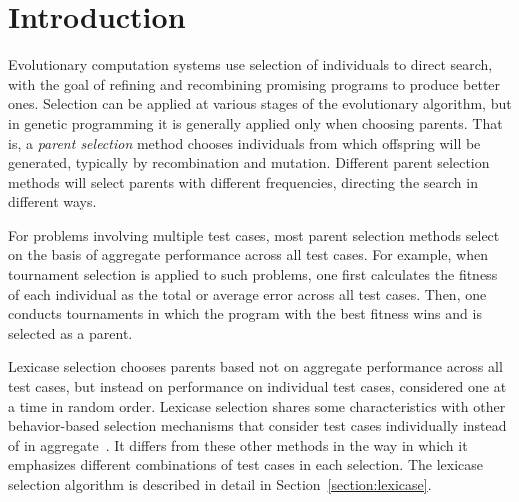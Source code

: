\documentclass{sig-alternate}
\begin{document}

%
%

%
%
\printccsdesc



\section{Introduction}
\label{section:introduction}

Evolutionary computation systems use selection of individuals to direct search, with the goal of refining and recombining promising programs to produce better ones. Selection can be applied at various stages of the evolutionary algorithm, but in genetic programming it is generally applied only when choosing parents. That is, a \emph{parent selection} method chooses individuals from which offspring will be generated, typically by recombination and mutation. Different parent selection methods will select parents with different frequencies, directing the search in different ways.

For problems involving multiple test cases, most parent selection methods select on the basis of aggregate performance across all test cases. For example, when tournament selection is applied to such problems, one first calculates the fitness of each individual as the total or average error across all test cases. Then, one conducts tournaments in which the program with the best fitness wins and is selected as a parent.

Lexicase selection chooses parents based not on aggregate performance across all test cases, but instead on performance on individual test cases, considered one at a time in random order. Lexicase selection shares some characteristics with other behavior-based selection mechanisms that consider test cases individually instead of in aggregate~\cite{Krawiec:2015:GPTP, Krawiec:2015:GECCO:smgpWorkshop}. It differs from these other methods in the way in which it emphasizes different combinations of test cases in each selection. The lexicase selection algorithm is described in detail in Section~\ref{section:lexicase}.
\end{document}
